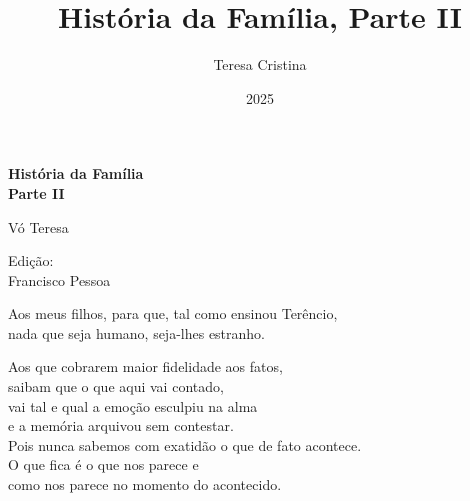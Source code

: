\documentclass[11pt, a5paper, twoside, openany]{book}
\title{História da Família, Parte II}
\author{Teresa Cristina}
\date{2025}
\newenvironment{dedication}{
    \clearpage
    \thispagestyle{empty}
    \vspace*{\stretch{3}}
    \small
    \itshape
    \raggedleft
}{\par\vspace*{\stretch{1}}\normalfont\justifying} %
\begin{document}



\frontmatter
\begin{titlepage}
\begin{center}
    \vspace*{6\baselineskip}

    {\Huge\textbf{História da Família\\Parte II}}
    \vspace*{2\baselineskip}

    Vó Teresa

    \vspace{10\baselineskip}
    {\small Edição:\\Francisco Pessoa}


\end{center}
\end{titlepage}

\begin{dedication}
Aos meus filhos, para que, tal como ensinou Terêncio,\\
nada que seja humano, seja-lhes estranho.

Aos que cobrarem maior fidelidade aos fatos, \\
saibam que o que aqui vai contado,\\
vai tal e qual a emoção esculpiu na alma\\ e a memória arquivou sem contestar.\\
Pois nunca sabemos com exatidão o que de fato acontece. \\
O que fica é o que nos parece e \\como nos parece no momento do acontecido.
\end{dedication}

\mainmatter











































\backmatter
\fancyhead[LE]{}

\end{document}
